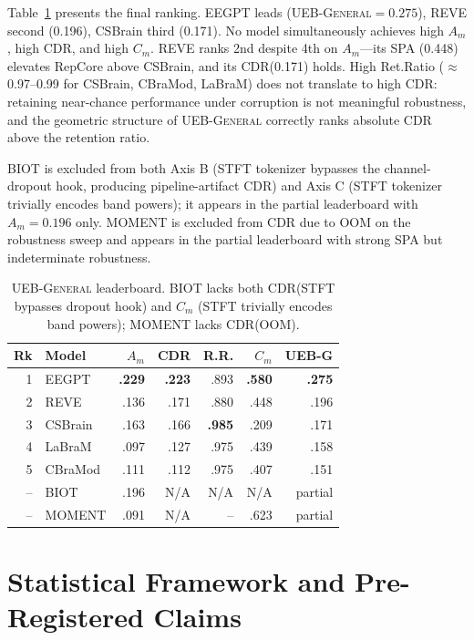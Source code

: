 \documentclass{article}
\newcommand{\cdr}{\textsc{CDR}\xspace}
\newcommand{\uebgen}{\textsc{UEB-General}\xspace}
\begin{document}
Table~\ref{tab:uebgeneral} presents the final ranking. EEGPT leads (\uebgen $= 0.275$), REVE second (0.196), CSBrain third (0.171). No model simultaneously achieves high $A_m$, high \cdr, and high $C_m$. REVE ranks 2nd despite 4th on $A_m$---its SPA (0.448) elevates RepCore above CSBrain, and its \cdr (0.171) holds. High Ret.Ratio ($\approx$0.97--0.99 for CSBrain, CBraMod, LaBraM) does not translate to high \cdr: retaining near-chance performance under corruption is not meaningful robustness, and the geometric structure of \uebgen correctly ranks absolute \cdr above the retention ratio.

BIOT is excluded from both Axis B (STFT tokenizer bypasses the channel-dropout hook, producing pipeline-artifact CDR) and Axis C (STFT tokenizer trivially encodes band powers); it appears in the partial leaderboard with $A_m = 0.196$ only. MOMENT is excluded from \cdr due to OOM on the robustness sweep and appears in the partial leaderboard with strong SPA but indeterminate robustness.

\begin{table}[t]
  \caption{\uebgen leaderboard. BIOT lacks both \cdr (STFT bypasses dropout hook) and $C_m$ (STFT trivially encodes band powers); MOMENT lacks \cdr (OOM).}
  \label{tab:uebgeneral}
  \centering
  \small
  \begin{tabular}{rlrrrrr}
    \toprule
    Rk & Model & $A_m$ & CDR & R.R. & $C_m$ & \textbf{UEB-G} \\
    \midrule
    1 & EEGPT & \textbf{.229} & \textbf{.223} & .893 & \textbf{.580} & \textbf{.275} \\
    2 & REVE & .136 & .171 & .880 & .448 & .196 \\
    3 & CSBrain & .163 & .166 & \textbf{.985} & .209 & .171 \\
    4 & LaBraM & .097 & .127 & .975 & .439 & .158 \\
    5 & CBraMod & .111 & .112 & .975 & .407 & .151 \\
    -- & BIOT & .196 & N/A & N/A & N/A & partial \\
    -- & MOMENT & .091 & N/A & -- & .623 & partial \\
    \bottomrule
  \end{tabular}
\end{table}

\section{Statistical Framework and Pre-Registered Claims}
\label{sec:stats}
\end{document}
